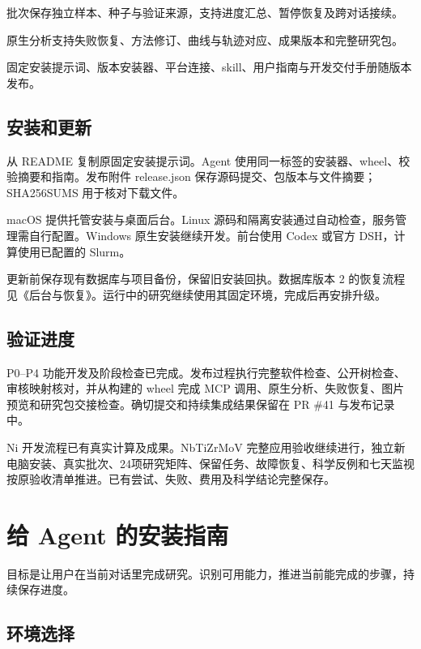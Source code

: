 \documentclass[11pt,a4paper]{ctexart}
\begin{document}
\noindent\textbullet\quad 批次保存独立样本、种子与验证来源，支持进度汇总、暂停恢复及跨对话接续。


\noindent\textbullet\quad 原生分析支持失败恢复、方法修订、曲线与轨迹对应、成果版本和完整研究包。


\noindent\textbullet\quad 固定安装提示词、版本安装器、平台连接、skill、用户指南与开发交付手册随版本发布。




\subsection{安装和更新}


从 README 复制原固定安装提示词。Agent 使用同一标签的安装器、wheel、校验摘要和指南。发布附件 release.json 保存源码提交、包版本与文件摘要；SHA256SUMS 用于核对下载文件。



macOS 提供托管安装与桌面后台。Linux 源码和隔离安装通过自动检查，服务管理需自行配置。Windows 原生安装继续开发。前台使用 Codex 或官方 DSH，计算使用已配置的 Slurm。



更新前保存现有数据库与项目备份，保留旧安装回执。数据库版本 2 的恢复流程见《后台与恢复》。运行中的研究继续使用其固定环境，完成后再安排升级。



\subsection{验证进度}


P0–P4 功能开发及阶段检查已完成。发布过程执行完整软件检查、公开树检查、审核映射核对，并从构建的 wheel 完成 MCP 调用、原生分析、失败恢复、图片预览和研究包交接检查。确切提交和持续集成结果保留在 PR \#41 与发布记录中。



Ni 开发流程已有真实计算及成果。NbTiZrMoV 完整应用验收继续进行，独立新电脑安装、真实批次、24项研究矩阵、保留任务、故障恢复、科学反例和七天监视按原验收清单推进。已有尝试、失败、费用及科学结论完整保存。

\clearpage
\section{给 Agent 的安装指南}


目标是让用户在当前对话里完成研究。识别可用能力，推进当前能完成的步骤，持续保存进度。



\subsection{环境选择}
\end{document}
